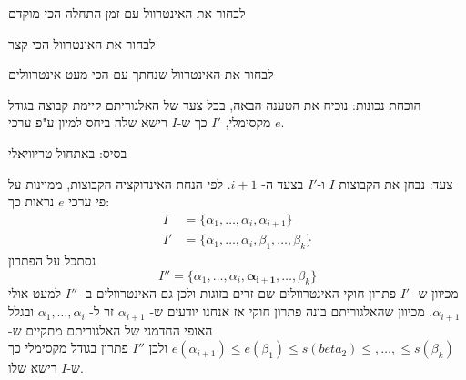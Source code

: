 לבחור את האינטרוול עם זמן התחלה הכי מוקדם
\begin{center}
\end{center}

לבחור את האינטרוול הכי קצר
\begin{center}
\end{center}

לבחור את האינטרוול שנחתך עם הכי מעט אינטרוולים
\begin{center}
\end{center}


הוכחת נכונות: נוכיח את הטענה הבאה, בכל צעד של האלגוריתם קיימת קבוצה בגודל מקסימלי, 
$I'$
כך ש-$I$ רישא שלה ביחס למיון ע"פ ערכי $e$.

בסיס: באתחול טריוויאלי

צעד: נבחן את הקבוצות $I$ ו-$I'$ בצעד ה-%
$i + 1$.
לפי הנחת האינדוקציה הקבוצות, ממוינות על פי ערכי $e$ נראות כך:
$$
\begin{array}{ll}
I & = \{\alpha_1, \ldots, \alpha_i, \alpha_{i+1}\}
\\
I' & = \{\alpha_1, \ldots, \alpha_i, \beta_1, \ldots, \beta_k\}
\end{array}
$$
נסתכל על הפתרון
$$
I'' =  \{\alpha_1, \ldots, \alpha_i, \bm{\alpha_{i+1}}, \ldots, \beta_k\}
$$
מכיוון ש-%
$I'$
פתרון חוקי האינטרוולים שם זרים בזוגות ולכן גם האינטרוולים ב-%
$I''$
למעט אולי 
$\alpha_{i+1}$.
מכיוון שהאלגוריתם בונה פתרון חוקי אז אנחנו יודעים ש-%
$\alpha_{i+1}$
זר ל-%
$\alpha_1, \ldots, \alpha_i$
ובגלל האופי החדמני של האלגוריתם מתקיים ש-%
$e(\alpha_{i+1}) \leq e(\beta_1) \leq s(beta_2) \leq, \ldots, \leq s(\beta_k)$
ולכן 
$I''$
פתרון בגודל מקסימלי כך ש-$I$ רישא שלו.
